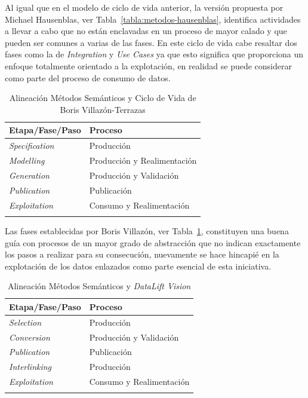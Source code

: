 Al igual que en el modelo de ciclo de vida anterior, la versión propuesta por Michael Hausenblas, ver Tabla~\ref{tabla:metodos-hausenblas}, identifica actividades
a llevar a cabo que no están enclavadas en un proceso de mayor calado y que pueden ser comunes a varias de las
fases. En este ciclo de vida cabe resaltar dos fases como la de \textit{Integration} y \textit{Use Cases} ya que
esto significa que proporciona un enfoque totalmente orientado a la explotación, en realidad se puede considerar como 
parte del proceso de consumo de datos.

\begin{longtable}[c]{|p{6cm}|p{8cm}|} 

\hline

  \textbf{Etapa/Fase/Paso} &  \textbf{Proceso} \\\hline

\endhead
\textit{Specification} & Producción \\ \hline
\textit{Modelling} & Producción y Realimentación \\ \hline
\textit{Generation} & Producción y Validación \\ \hline
\textit{Publication} & Publicación \\ \hline
\textit{Exploitation} & Consumo y Realimentación \\ \hline
\hline
\caption{Alineación Métodos Semánticos y Ciclo de Vida de Boris Villazón-Terrazas}  \label{tabla:metodos-boris}\\    
\end{longtable}

Las fases establecidas por Boris Villazón, ver Tabla~\ref{tabla:metodos-boris}, constituyen una buena guía con procesos
de un mayor grado de abstracción que no indican exactamente los pasos a realizar para su consecución, nuevamente se
hace hincapié en la explotación de los datos enlazados como parte esencial de esta iniciativa.

\begin{longtable}[c]{|p{6cm}|p{8cm}|} 

\hline

  \textbf{Etapa/Fase/Paso} &  \textbf{Proceso} \\\hline

\endhead
\textit{Selection} & Producción \\ \hline
\textit{Conversion} & Producción y Validación \\ \hline
\textit{Publication} & Publicación \\ \hline
\textit{Interlinking} & Producción \\ \hline
\textit{Exploitation} & Consumo y Realimentación \\ \hline
\hline
\caption{Alineación Métodos Semánticos y \textit{DataLift Vision}}  \label{tabla:metodos-data-lift}\\    
\end{longtable}

